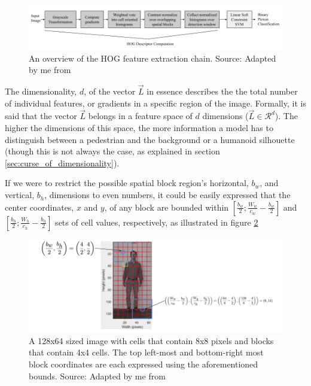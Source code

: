 \begin{figure}
    \centering
    \includegraphics[width=1\linewidth]{images/HOG Pipeline.png}
    \caption{An overview of the HOG feature extraction chain. Source: Adapted by me from \cite{dalal_2005_histograms}}
    \label{fig:hog_pipeline}
\end{figure}

The dimensionality, $d$, of the vector $\vec{L}$ in essence describes the the total number of individual features, or gradients in a specific region of the image. Formally, it is said that the vector $\vec{L}$ belongs in a feature space of $d$ dimensions ($\vec{L} \in \mathcal{R}^{d}$). The higher the dimensions of this space, the more information a model has to distinguish between a pedestrian and the background or a humanoid silhouette (though this is not always the case, as explained in section \ref{sec:curse_of_dimensionality}). 

If we were to restrict the possible spatial block region's horizontal, $b_w$, and vertical, $b_h$, dimensions to even numbers, it could be easily expressed that the center coordinates, $x$ and $y$, of any block are bounded within $\left[ \frac{b_w}{2}; \frac{W_w}{c_w} - \frac{b_w}{2}\right]$ and $\left[ \frac{b_h}{2}; \frac{W_h}{c_h} - \frac{b_h}{2}\right]$ sets of cell values, respectively, as illustrated in figure \ref{fig:center_coords}

\begin{figure}
    \centering
    \includegraphics[width=1\linewidth]{images/Center Coordinates.png}
    \caption{A 128x64 sized image with cells that contain 8x8 pixels and blocks that contain 4x4 cells. The top left-most and bottom-right most block coordinates are each expressed using the aforementioned bounds. Source: Adapted by me from \cite{shidlovskiy_2020_reducing}}
    \label{fig:center_coords}
\end{figure}

